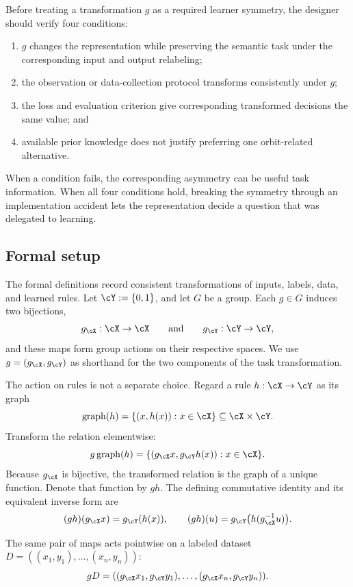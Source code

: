 \documentclass[11pt,twoside]{article}
\theoremstyle{definition}
\theoremstyle{remark}
\begin{document}
Before treating a transformation \(g\) as a required learner symmetry, the
designer should verify four conditions:
\begin{enumerate}[leftmargin=*]
\item \(g\) changes the representation while preserving the semantic task
under the corresponding input and output relabeling;
\item the observation or data-collection protocol transforms consistently
under \(g\);
\item the loss and evaluation criterion give corresponding transformed
decisions the same value; and
\item available prior knowledge does not justify preferring one
orbit-related alternative.
\end{enumerate}
When a condition fails, the corresponding asymmetry can be useful task
information. When all four conditions hold, breaking the symmetry through an
implementation accident lets the representation decide a question that was
delegated to learning.

\subsection{Formal setup}
\label{sec:symmetry-formal}

The formal definitions record consistent transformations of inputs, labels,
data, and learned rules. Let \(\cY:=\{0,1\}\), and let \(G\) be a group. Each
\(g\in G\) induces two bijections,
\[
 g_{\cX}:\cX\to\cX
 \qquad\text{and}\qquad
 g_{\cY}:\cY\to\cY,
\]
and these maps form group actions on their respective spaces. We use
\(g=(g_{\cX},g_{\cY})\) as shorthand for the two components of the task
transformation.

The action on rules is not a separate choice. Regard a rule
\(h:\cX\to\cY\) as its graph
\[
 \operatorname{graph}(h)=\{(x,h(x)):x\in\cX\}
 \subseteq\cX\times\cY.
\]
Transform the relation elementwise:
\[
 g\operatorname{graph}(h)
 =\{(g_{\cX}x,g_{\cY}h(x)):x\in\cX\}.
\]
Because \(g_{\cX}\) is bijective, the transformed relation is the graph of a
unique function. Denote that function by \(gh\). The defining commutative
identity and its equivalent inverse form are
\begin{equation}
 (gh)(g_{\cX}x)=g_{\cY}(h(x)),
 \qquad
 (gh)(u)=g_{\cY}\bigl(h(g_{\cX}^{-1}u)\bigr).
 \label{eq:function-action}
\end{equation}

The same pair of maps acts pointwise on a labeled dataset
\(D=((x_1,y_1),\ldots,(x_n,y_n))\):
\begin{equation}
 gD=((g_{\cX}x_1,g_{\cY}y_1),\ldots,
      (g_{\cX}x_n,g_{\cY}y_n)).
 \label{eq:data-action}
\end{equation}
\end{document}
